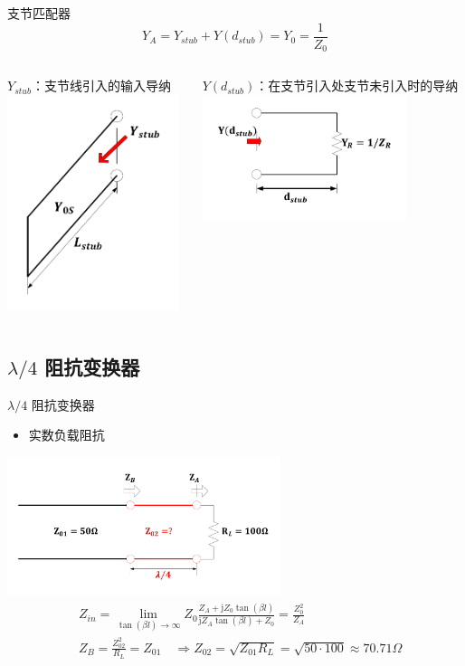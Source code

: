 \begin{frame}{支节匹配器}
  $$Y_A=Y_{stub}+Y(d_{stub})=Y_0=\frac{1}{Z_0}$$
  \begin{columns}
    \begin{column}{0.5\linewidth}
      $Y_{stub}$：支节线引入的输入导纳\\
      \includegraphics[width=5cm]{fig4-25.pdf}
    \end{column}
    \begin{column}{0.5\linewidth}
      $Y(d_{stub})$：在支节引入处支节未引入时的导纳\\
      \includegraphics[width=6cm]{fig4-26.pdf}
    \end{column}
  \end{columns}

\end{frame}

\subsection{$\lambda/4$ 阻抗变换器}
\begin{frame}{$\lambda/4$ 阻抗变换器}
  \begin{itemize}
    \item 实数负载阻抗
  \end{itemize}
  \centering
  \includegraphics[width=8cm]{fig4-27.pdf}
  \begin{align*}
     & Z_{in}=\lim_{\tan(\beta l)\to\infty}Z_0\frac{Z_A+\mathrm{j}Z_0\tan(\beta l)}{\mathrm{j}Z_A\tan(\beta l)+Z_0}=\frac{Z_0^2}{Z_A} \\
     & Z_B=\frac{Z_{02}^2}{R_L}=Z_{01}\quad \Rightarrow Z_{02}=\sqrt{Z_{01}R_L}=\sqrt{50\cdot 100}\approx 70.71\Omega
  \end{align*}
\end{frame}

